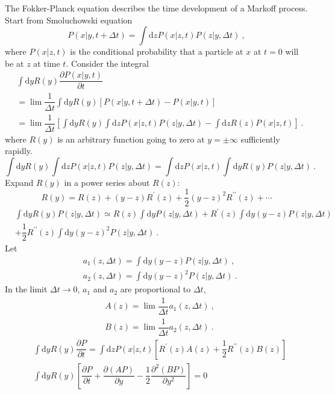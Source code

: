 \documentclass[11pt,a4paper]{article}
\newcommand{\dif}{\mathrm{d}}
\begin{document}
\cite{kittel1958elementary} The Fokker-Planck equation describes the time development of a Markoff process. Start from Smoluchowski equation 
\begin{equation}
P(x|y, t +\Delta t) = \int \dif z P(x|z, t) P(z|y, \Delta t) ~,
\end{equation}
where $P(x|z, t)$ is the conditional probability that a particle at $x$ at $t=0$ will be at $z$ at time $t$. Consider the integral 
\begin{align}
& \int \dif y R(y) \dfrac{\partial P(x|y, t) }{\partial t}  \\
\nonumber &= \lim \dfrac{1}{\Delta t} \int \dif y R(y) [P(x|y, t +\Delta t) - P(x|y, t)] \\
\nonumber &= \lim \dfrac{1}{\Delta t} \left[ \int \dif y R(y) \int \dif z P(x|z, t)  P(z|y, \Delta t) - \int \dif z R(z) P(x|z, t) \right]  ~.
\end{align}
where $R(y)$ is an arbitrary function going to zero at $y = \pm \infty$ sufficiently rapidly. 
\begin{equation}
\int \dif y R(y) \int \dif z P(x|z, t)  P(z|y, \Delta t) = \int \dif z P(x|z, t)  \int \dif y R(y) P(z|y, \Delta t) ~.
\end{equation}
Expand $R(y)$ in a power series about $R(z)$:
\begin{equation}
R(y) = R(z) + (y-z) R^\prime (z) +\dfrac{1}{2} (y-z)^2 R^{\prime \prime} (z) + \cdots 
\end{equation}
\begin{align}
\nonumber & \int \dif y R(y) P(z|y, \Delta t) \simeq R(z) \int \dif y P(z|y, \Delta t) + R^\prime(z) \int \dif y (y-z) P(z|y, \Delta t) \\
&+\dfrac{1}{2} R^{\prime \prime} (z) \int \dif y (y-z)^2  P(z|y, \Delta t) ~.
\end{align}
Let
\begin{align}
& a_1(z, \Delta t) = \int \dif y (y-z) P(z|y, \Delta t) ~, \\
& a_2(z, \Delta t) = \int \dif y (y-z)^2 P(z|y, \Delta t) ~.
\end{align}
In the limit $\Delta t \rightarrow 0$, $a_1$ and $a_2$ are proportional to $\Delta t$, 
\begin{align}
& A(z) = \lim \dfrac{1}{\Delta t} a_1(z, \Delta t) ~, \\
& B(z) = \lim \dfrac{1}{\Delta t} a_2(z, \Delta t) ~.
\end{align}
\begin{align}
&\int \dif y R(y) \dfrac{\partial P}{\partial t} = \int \dif z P(x|z, t) [R^\prime(z) A(z) +\dfrac{1}{2} R^{\prime \prime}(z) B(z)] \\
& \int \dif y R(y) \left[\dfrac{\partial P}{\partial t} + \dfrac{\partial (AP)}{\partial y} - \dfrac{1}{2} \dfrac{\partial^2 (BP)}{\partial y^2} \right] = 0 
\end{align}
\end{document}
